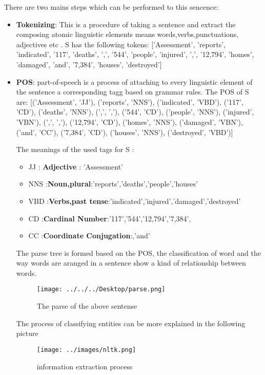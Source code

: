 There are two mains steps which can be performed to this sencence:
\begin{itemize}
\item \textbf{Tokenizing}: This is a procedure of taking a sentence and extract the composing atomic linguistic elements means words,verbs,punctuations, adjectives etc .
S has the following tokens: ['Assessment', 'reports', 'indicated', '117', 'deaths', ',', '544', 'people', 'injured', ',', '12,794', 'homes', 'damaged', 'and', '7,384', 'houses', 'destroyed']
\item \textbf{POS}: part-of-speech is a process of attaching to every linguistic element of the sentence a corresponding tagg based on grammar rules.
The POS of S  are: 
[('Assessment', 'JJ'), ('reports', 'NNS'), ('indicated', 'VBD'), ('117', 'CD'), ('deaths', 'NNS'), (',', ','), ('544', 'CD'), ('people', 'NNS'), ('injured', 'VBN'), (',', ','), ('12,794', 'CD'), ('homes', 'NNS'), ('damaged', 'VBN'), ('and', 'CC'), ('7,384', 'CD'), ('houses', 'NNS'), ('destroyed', 'VBD')]

The meanings of the used tags for S :

\begin{itemize}
\item JJ : \textbf{Adjective} :  'Assessment'   
\item NNS :\textbf{Noun,plural}:'reports','deaths','people','houses'
\item VBD :\textbf{Verbs,past tense}:'indicated','injured','damaged','destroyed'
\item CD :\textbf{Cardinal Number}:'117','544','12,794','7,384',
\item CC :\textbf{Coordinate Conjugation}:,'and'
\end{itemize}
The parse tree is formed based on the POS, the classification of word and the way words are aranged in a sentence show a kind of relationship between words.
\begin{figure}[hbtp]
\caption{The parse of the above sentense}
\centering
\texttt{[image: ../../../Desktop/parse.png]}
\end{figure}


The process of classifying entities can be more explained in the following picture

\begin{figure}[hbtp]
\caption{information extraction process}
\centering
\texttt{[image: ../images/nltk.png]}
\end{figure}
\end{itemize}

